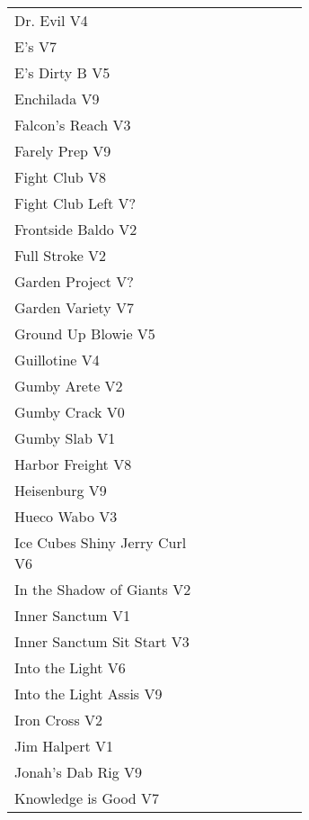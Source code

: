 \begin{multicols*}{2}
\begin{center}
\begin{supertabular}{p{0.65\linewidth}r}
Dr. Evil V4 & \pageref{rt:Dr. Evil} \\
E's V7 & \pageref{rt:E's} \\
E's Dirty B V5 & \pageref{rt:E's Dirty B} \\
Enchilada V9 & \pageref{rt:Enchilada} \\
Falcon's Reach V3 & \pageref{rt:Falcon's Reach} \\
Farely Prep V9 & \pageref{rt:Farely Prep} \\
Fight Club V8 & \pageref{rt:Fight Club} \\
Fight Club Left V? & \pageref{rt:Fight Club Left} \\
Frontside Baldo V2 & \pageref{rt:Frontside Baldo} \\
Full Stroke V2 & \pageref{rt:Full Stroke} \\
Garden Project V? & \pageref{rt:Garden Project} \\
Garden Variety V7 & \pageref{rt:Garden Variety} \\
Ground Up Blowie V5 & \pageref{rt:Ground Up Blowie} \\
Guillotine V4 & \pageref{rt:Guillotine} \\
Gumby Arete V2 & \pageref{rt:Gumby Arete} \\
Gumby Crack V0 & \pageref{rt:Gumby Crack} \\
Gumby Slab V1 & \pageref{rt:Gumby Slab} \\
Harbor Freight V8 & \pageref{vr:Harbor Freight} \\
Heisenburg V9 & \pageref{rt:Heisenburg} \\
Hueco Wabo V3 & \pageref{rt:Hueco Wabo} \\
Ice Cubes Shiny Jerry Curl V6 & \pageref{rt:Ice Cubes Shiny Jerry Curl} \\
In the Shadow of Giants V2 & \pageref{rt:In the Shadow of Giants} \\
Inner Sanctum V1 & \pageref{rt:Inner Sanctum} \\
Inner Sanctum Sit Start V3 & \pageref{vr:Inner Sanctum Sit Start} \\
Into the Light V6 & \pageref{rt:Into the Light} \\
Into the Light Assis V9 & \pageref{vr:Into the Light Assis} \\
Iron Cross V2 & \pageref{vr:Iron Cross} \\
Jim Halpert V1 & \pageref{rt:Jim Halpert} \\
Jonah's Dab Rig V9 & \pageref{rt:Jonah's Dab Rig} \\
Knowledge is Good V7 & \pageref{rt:Knowledge is Good} \\

\end{supertabular}
\end{center}
\end{multicols*}
